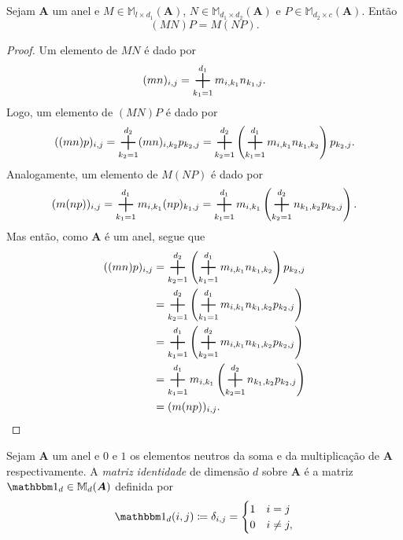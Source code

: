 \begin{prop}
	Sejam $\bm A$ um anel e $M \in \mathbb M_{l \times d_1}(\bm A)$, $N \in \mathbb M_{d_1 \times d_2}(\bm A)$ e $P \in \mathbb M_{d_2 \times c}(\bm A)$. Então
	\begin{equation*}
	(MN)P = M(NP).
	\end{equation*}
\end{prop}
\begin{proof} Um elemento de $MN$ é dado por
	\begin{equation*}
	(mn)_{i,j} = \bigsum_{k_1=1}^{d_1} m_{i,k_1}n_{k_1,j}.
	\end{equation*}
Logo, um elemento de $(MN)P$ é dado por
	\begin{equation*}
	((mn)p)_{i,j} = \bigsum_{k_2=1}^{d_2} (mn)_{i,k_2}p_{k_2,j} = \bigsum_{k_2=1}^{d_2} \left(\bigsum_{k_1=1}^{d_1} m_{i,k_1}n_{k_1,k_2}\right)p_{k_2,j}.
	\end{equation*}
Analogamente, um elemento de $M(NP)$ é dado por
	\begin{equation*}
	(m(np))_{i,j} = \bigsum_{k_1=1}^{d_1} m_{i,k_1}(np)_{k_1,j} = \bigsum_{k_1=1}^{d_1} m_{i,k_1}\left(\bigsum_{k_2=1}^{d_2} n_{k_1,k_2}p_{k_2,j}\right).
	\end{equation*}
Mas então, como $\bm A$ é um anel, segue que
	\begin{align*}
	((mn)p)_{i,j}
	&= \bigsum_{k_2=1}^{d_2} \left(\bigsum_{k_1=1}^{d_1} m_{i,k_1}n_{k_1,k_2}\right)p_{k_2,j} \\
	&= \bigsum_{k_2=1}^{d_2} \left(\bigsum_{k_1=1}^{d_1} m_{i,k_1}n_{k_1,k_2}p_{k_2,j}\right) \\
	&= \bigsum_{k_1=1}^{d_1} \left(\bigsum_{k_2=1}^{d_2} m_{i,k_1}n_{k_1,k_2}p_{k_2,j}\right) \\
	&= \bigsum_{k_1=1}^{d_1} m_{i,k_1}\left(\bigsum_{k_2=1}^{d_2} n_{k_1,k_2}p_{k_2,j}\right) \\
	&= (m(np))_{i,j}.
	\end{align*}
\end{proof}

\begin{defi}
	Sejam $\bm A$ um anel e $0$ e $1$ os elementos neutros da soma e da multiplicação de $\bm A$ respectivamente. A \emph{matriz identidade} de dimensão $d$ sobre $\bm A$ é a matriz $\id_d \in \mathbb M_d(\bm A)$ definida por
	\begin{equation*}
	\id_d(i,j) \coloneqq \delta_{i,j} =
		\begin{cases}
			1 & i = j \\
			0 & i \neq j,
		\end{cases}
	\end{equation*}
\end{defi}

